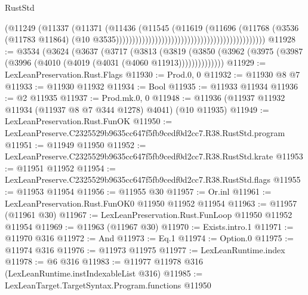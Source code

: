 \begin{lexlean}{RustStd}
\begin{coremodule}
                                                                            (@11249
                                                                              (@11337
                                                                                (@11371
                                                                                  (@11436
                                                                                    (@11545
                                                                                      (@11619
                                                                                        (@11696
                                                                                          (@11768
                                                                                            (@3536
                                                                                              (@11783
                                                                                                @11864)
                                                                                              (@10
                                                                                                @3535))))))))))))))))))))))))))))))))))))))))))))))
@11928 := @3534
    (@3624
      (@3637
        (@3717
          (@3813
            (@3819
              (@3850 (@3962 (@3975 (@3987 (@3996 (@4010 (@4019 (@4031 (@4060 @11913))))))))))))))
@11929 := LexLeanPreservation.Rust.Flags
@11930 := Prod.{0, 0}
@11932 := @11930 @8 @7
@11933 := @11930 @11932
@11934 := Bool
@11935 := @11933 @11934
@11936 := @2 @11935
@11937 := Prod.mk.{0, 0}
@11948 := @11936 (@11937 @11932 @11934 (@11937 @8 @7 @344 @1278) @4041) (@10 @11935)
@11949 := LexLeanPreservation.Rust.FunOK
@11950 := LexLeanPreserve.C2325529b9635cc647f5fb9cedf0d2cc7.R38.RustStd.program
@11951 := @11949 @11950
@11952 := LexLeanPreserve.C2325529b9635cc647f5fb9cedf0d2cc7.R38.RustStd.krate
@11953 := @11951 @11952
@11954 := LexLeanPreserve.C2325529b9635cc647f5fb9cedf0d2cc7.R38.RustStd.flags
@11955 := @11953 @11954
@11956 := @11955 @30
@11957 := Or.inl
@11961 := LexLeanPreservation.Rust.FunOK0 @11950 @11952 @11954
@11963 := @11957 (@11961 @30)
@11967 := LexLeanPreservation.Rust.FunLoop @11950 @11952 @11954
@11969 := @11963 (@11967 @30)
@11970 := Exists.intro.{1}
@11971 := @11970 @316
@11972 := And
@11973 := Eq.{1}
@11974 := Option.{0}
@11975 := @11974 @316
@11976 := @11973 @11975
@11977 := LexLeanRuntime.index
@11978 := @6 @316
@11983 := @11977 @11978 @316 (LexLeanRuntime.instIndexableList @316)
@11985 := LexLeanTarget.TargetSyntax.Program.functions @11950

\end{coremodule}
\end{lexlean}
